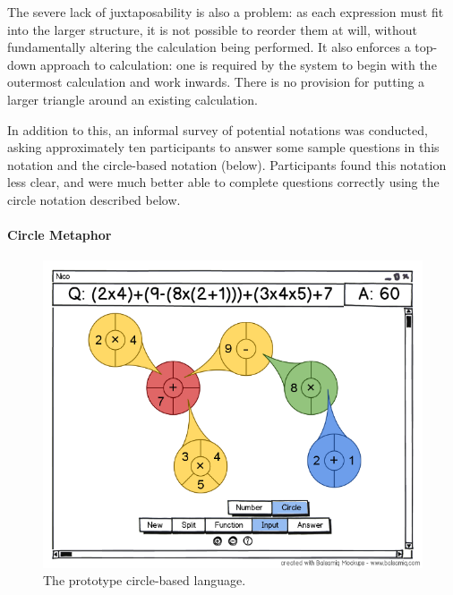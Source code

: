 \documentclass[12pt,twoside,notitlepage,xetex]{report}
\begin{document}
The severe lack of juxtaposability is also a problem: as each expression must fit into the larger structure, it is not possible to reorder them at will, without fundamentally altering the calculation being performed.  It also enforces a top-down approach to calculation: one is required by the system to begin with the outermost calculation and work inwards.  There is no provision for putting a larger triangle around an existing calculation.

In addition to this, an informal survey of potential notations was conducted, asking approximately ten participants to answer some sample questions in this notation and the circle-based notation (below).  Participants found this notation less clear, and were much better able to complete questions correctly using the circle notation described below.


\paragraph{Circle Metaphor}\hfill

\begin{figure}[H]
\begin{center}
\includegraphics[width=\textwidth]{figs/mockups/circles/nico_circmock.png}
\caption{The prototype circle-based language.}
\label{fig:ProtoCirc}
\end{center}
\end{figure}
\end{document}
